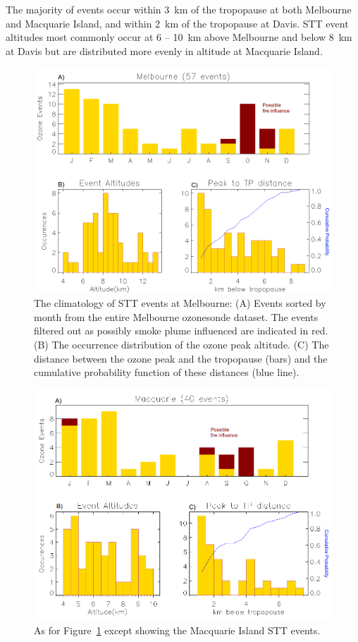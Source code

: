     The majority of events occur within 3~km of the tropopause at both Melbourne and Macquarie Island, and within 2~km of the tropopause at Davis. 
    STT event altitudes most commonly occur at 6 -- 10~km above Melbourne and below 8~km at Davis but are distributed more evenly in altitude at Macquarie Island. 
    
    \begin{figure}[!htbp]
      \includegraphics[width=0.8\columnwidth]{Figures/Ozone/Summary_Melb}
      \caption{
	The climatology of STT events at Melbourne: (A) Events sorted by month from the entire Melbourne ozonesonde dataset. The events filtered out as possibly smoke plume influenced are indicated in red. (B) The occurrence distribution of the ozone peak altitude. (C) The distance between the ozone peak and the tropopause (bars)  and the cumulative probability function of these distances (blue line).%
      }
      \label{ch_o3:fig:SummaryMelbourne}
    \end{figure}

    \begin{figure}[!htbp]
      \includegraphics[width=0.8\columnwidth]{Figures/Ozone/Summary_Macq}
      \caption{
      As for Figure~\ref{ch_o3:fig:SummaryMelbourne} except showing the Macquarie Island STT events.%
      }
      \label{ch_o3:fig:SummaryMacquarie}
    \end{figure}

